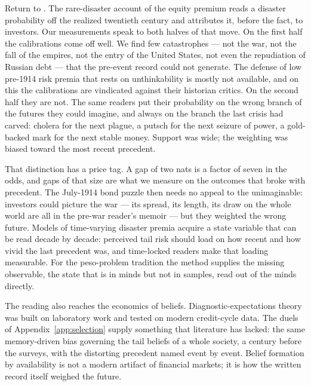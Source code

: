 \documentclass[11pt]{article}
\begin{document}
Return to \citet{barro2006}. The rare-disaster account of the equity premium reads a disaster probability
off the realized twentieth century and attributes it, before the fact, to investors. Our measurements speak
to both halves of that move. On the first half the calibrations come off well. We find few catastrophes ---
not the war, not the fall of the empires, not the entry of the United States, not even the repudiation of
Russian debt --- that the pre-event record could not generate. The defense of low pre-1914 risk premia that
rests on unthinkability is mostly not available, and on this the calibrations are vindicated against their
historian critics. On the second half they are not. The same readers put their probability on the wrong
branch of the futures they could imagine, and always on the branch the last crisis had carved: cholera for
the next plague, a putsch for the next seizure of power, a gold-backed mark for the next stable money.
Support was wide; the weighting was biased toward the most recent precedent.

That distinction has a price tag. A gap of two nats is a factor of seven in the odds, and gaps of that size
are what we measure on the outcomes that broke with precedent. The July-1914 bond puzzle \citep{ferguson2006}
then needs no appeal to the unimaginable: investors could picture the war --- its spread, its length, its
draw on the whole world are all in the pre-war reader's memoir --- but they weighted the wrong future.
Models of time-varying disaster premia \citep{gabaix2012,wachter2013} acquire a state variable that can be
read decade by decade: perceived tail risk should load on how recent and how vivid the last precedent was,
and time-locked readers make that loading measurable. For the peso-problem tradition \citep{krasker1980} the
method supplies the missing observable, the state that is in minds but not in samples, read out of the minds
directly.

The reading also reaches the economics of beliefs. Diagnostic-expectations theory
\citep{bordalo2018,gennaioli2018} was built on laboratory work \citep{tversky1973} and tested on modern
credit-cycle data. The duels of Appendix~\ref{app:selection} supply something that literature has lacked:
the same memory-driven bias governing the tail beliefs of a whole society, a century before the surveys,
with the distorting precedent named event by event. Belief formation by availability is not a modern
artifact of financial markets; it is how the written record itself weighed the future.
\end{document}

